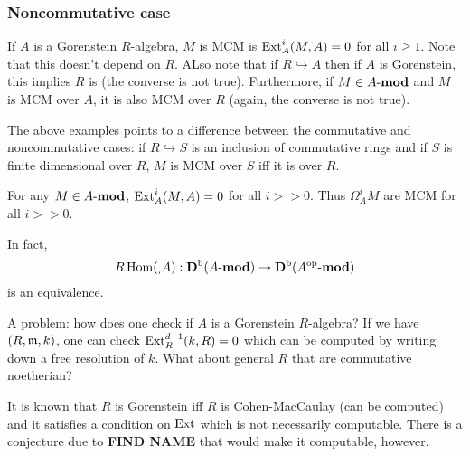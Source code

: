 \documentclass[12pt]{article}
\begin{document}
 \subsubsection{Noncommutative case}
 If $A$ is a Gorenstein $R$-algebra, $M$ is MCM is $\operatorname{Ext}_A^i(M,A)=0$ for all $i\ge 1.$ Note that this doesn't depend on $R$. ALso note that if $R\hookrightarrow A$ then if $A$ is Gorenstein, this implies $R$ is (the converse is not true). Furthermore, if $M\in A\text{-}\mathbf{mod}$ and $M$ is MCM over $A$, it is also MCM over $R$ (again, the converse is not true).
 
 The above examples points to a difference between the commutative and noncommutative cases: if $R\hookrightarrow S$ is an inclusion of commutative rings and if $S$ is finite dimensional over $R$, $M$ is MCM over $S$ iff it is over $R$.
 
 \begin{thm}
 For any $M\in A\text{-}\mathbf{mod}$, $\operatorname{Ext}_A^i(M,A)=0$ for all $i>>0$. Thus $\Omega_A^iM$ are MCM for all $i>>0.$
 \end{thm}
 In fact,
 \[R\operatorname{Hom}(_,A):\mathbf{D}^\text{b}(A\text{-}\mathbf{mod})\to \mathbf{D}^\text{b}(A^{\text{op}}\text{-}\mathbf{mod})\]
 is an equivalence.
 
 A problem: how does one check if $A$ is a Gorenstein $R$-algebra? If we have $(R,\mathfrak{m}, k)$, one can check $\operatorname{Ext}_R^{d+1}(k,R)=0$ which can be computed by writing down a free resolution of $k$. What about general $R$ that are commutative noetherian? 
 
 It is known that $R$ is Gorenstein iff $R$ is Cohen-MacCaulay (can be computed) and it satisfies a condition on $\operatorname{Ext}$ which is not necessarily computable. There is a conjecture due to \textbf{FIND NAME} that would make it computable, however.
\end{document}
